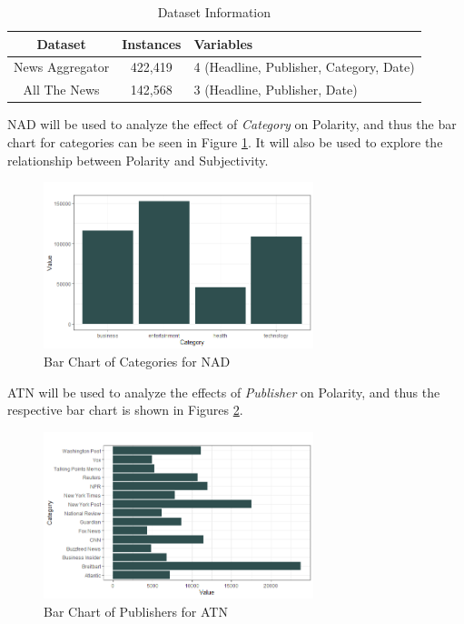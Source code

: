 \documentclass[12pt]{article}
\begin{document}
\begin{table}[H]
    \centering
    \begin{tabular}{|c|c|p{7cm}|}
        \hline
        \textbf{Dataset} & \textbf{Instances} & \textbf{Variables}   \\
        \hline
        News Aggregator & 422,419 & 4 \newline (Headline, Publisher, Category, Date) \\ 
        All The News & 142,568 & 3 \newline (Headline, Publisher, Date)\\
        \hline
    \end{tabular}
    \caption{Dataset Information}
    \label{tab:datasets}
\end{table}

NAD will be used to analyze the effect of \textit{Category} on Polarity, and thus the bar chart for categories can be seen in Figure \ref{fig:NAD_Category_Bar}. It will also be used to explore the relationship between Polarity and Subjectivity.

\begin{figure}[H]
    \centering
    \includegraphics[width=0.7\textwidth]{images/NAD_Category_Bar.png}
    \caption{Bar Chart of Categories for NAD}
    \label{fig:NAD_Category_Bar}
\end{figure}

ATN will be used to analyze the effects of \textit{Publisher} on Polarity, and thus the respective bar chart is shown in Figures \ref{fig:ATN_Publisher_Bar}.

\begin{figure}[H]
    \centering
    \includegraphics[width=0.7\textwidth]{images/ATN_Publisher_Bar.png}
    \caption{Bar Chart of Publishers for ATN}
    \label{fig:ATN_Publisher_Bar}
\end{figure}
\end{document}
